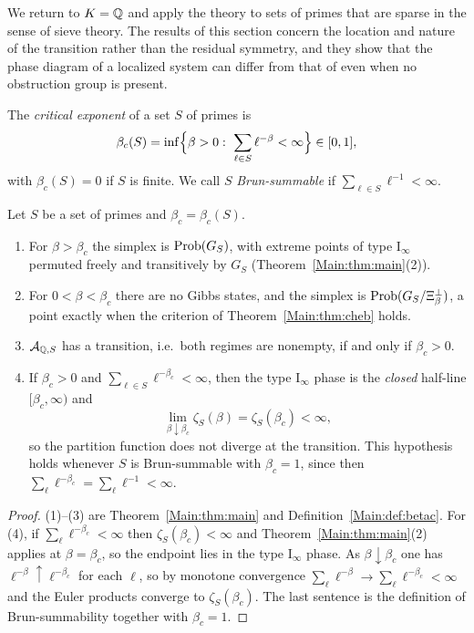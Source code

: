 We return to $K=\mathbb{Q}$ and apply the theory to sets of primes that are sparse in
the sense of sieve theory. The results of this section concern the location and
nature of the transition rather than the residual symmetry, and they show that
the phase diagram of a localized system can differ from that of \cite{BC} even
when no obstruction group is present.

\begin{definition}\label{Main:def:betac}
The \emph{critical exponent} of a set $S$ of primes is
\[
\beta_c(S)=\inf\Bigl\{\beta>0:\ \sum_{\ell\in S}\ell^{-\beta}<\infty\Bigr\}\in[0,1],
\]
with $\beta_c(S)=0$ if $S$ is finite. We call $S$ \emph{Brun-summable} if
$\sum_{\ell\in S}\ell^{-1}<\infty$.
\end{definition}

\begin{theorem}\label{Main:thm:crit}
Let $S$ be a set of primes and $\beta_c=\beta_c(S)$.
\begin{enumerate}
\item For $\beta>\beta_c$ the simplex is $\mathrm{Prob}(G_S)$, with extreme points of
type $\mathrm I_\infty$ permuted freely and transitively by $G_S$
(Theorem~\ref{Main:thm:main}(2)).
\item For $0<\beta<\beta_c$ there are no Gibbs states, and the simplex is
$\mathrm{Prob}(G_S/\Xi_\beta^\perp)$, a point exactly when the criterion of
Theorem~\ref{Main:thm:cheb} holds.
\item $\mathcal{A}_{\mathbb{Q},S}$ has a transition, i.e.\ both regimes are nonempty, if and
only if $\beta_c>0$.
\item If $\beta_c>0$ and $\sum_{\ell\in S}\ell^{-\beta_c}<\infty$, then the
type $\mathrm I_\infty$ phase is the \emph{closed} half-line $[\beta_c,\infty)$
and
\[
\lim_{\beta\downarrow\beta_c}\zeta_S(\beta)=\zeta_S(\beta_c)<\infty ,
\]
so the partition function does not diverge at the transition. This hypothesis
holds whenever $S$ is Brun-summable with $\beta_c=1$, since then
$\sum_\ell\ell^{-\beta_c}=\sum_\ell\ell^{-1}<\infty$.
\end{enumerate}
\end{theorem}

\begin{proof}
(1)--(3) are Theorem~\ref{Main:thm:main} and Definition~\ref{Main:def:betac}. For (4), if
$\sum_\ell\ell^{-\beta_c}<\infty$ then $\zeta_S(\beta_c)<\infty$ and
Theorem~\ref{Main:thm:main}(2) applies at $\beta=\beta_c$, so the endpoint lies in
the type $\mathrm I_\infty$ phase. As $\beta\downarrow\beta_c$ one has
$\ell^{-\beta}\uparrow\ell^{-\beta_c}$ for each $\ell$, so by monotone
convergence $\sum_\ell\ell^{-\beta}\to\sum_\ell\ell^{-\beta_c}<\infty$ and the
Euler products converge to $\zeta_S(\beta_c)$. The last sentence is the
definition of Brun-summability together with $\beta_c=1$.
\end{proof}

